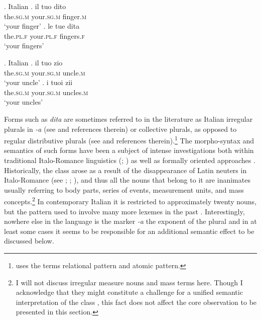 		\ex. Italian \citep[p. 125]{acquaviva2008lexical}\label{ex:italian-irregular-plurals-agreement} 
        \ag. il tuo dito\\
		the\textsc{.sg.m} your\textsc{.sg.m} finger\textsc{.m}\\
		`your finger'
		\bg. le tue dita\\
		the\textsc{.pl.f} your\textsc{.pl.f} fingers\textsc{.f}\\
		`your fingers'

		\ex. Italian \citep[p. 125]{acquaviva2008lexical}\label{ex:italian-regular-plurals-agreement}
        \ag. il tuo zio\\
		the\textsc{.sg.m} your\textsc{.sg.m} uncle\textsc{.m}\\
		`your uncle'
		\bg. i tuoi zii\\
		the\textsc{.sg.m} your\textsc{.sg.m} uncles\textsc{.m}\\
		`your uncles'
	
Forms such as \textit{dita} are sometimes referred to in the literature as Italian irregular plurals in \textit{-a} (see \citealt{acquaviva2008lexical} and references therein) or collective plurals, as opposed to regular distributive plurals (see \citealt{corbett2000number} and references therein).\footnote{\citet{kucerova2015two} uses the terms relational pattern and atomic pattern.} The morpho-syntax and semantics of such forms have been a subject of intense investigations both within traditional Italo-Romance linguistics (\citealt{hall1956plurale}; \citealt[pp. 30--90]{brunet1978grammaire}) as well as formally oriented approaches \citep{ojeda1995semantics,acquaviva2008lexical,kucerova2015two}. Historically, the class arose as a result of the disappearance of Latin neuters in Italo-Romance (see \citealt[pp. 46--51]{lofstedt1956syntactica}; \citealt{lausberg1963romanische}; \citealt{rohlfs1966grammatica}), and thus all the nouns that belong to it are inanimates usually referring to body parts, series of events, measurement units, and mass concepts.\footnote{I will not discuss irregular measure nouns and mass terms here. Though I acknowledge that they might constitute a challenge for a unified semantic interpretation of the class \citep[cf.][]{ojeda1995semantics,acquaviva2008lexical}, this fact does not affect the core observation to be presented in this section.} In contemporary Italian it is restricted to approximately twenty nouns, but the pattern used to involve many more lexemes in the past \citep{santangelo1981plurali}. Interestingly, nowhere else in the language is the marker \textit{-a} the exponent of the plural and in at least some cases it seems to be responsible for an additional semantic effect to be discussed below.
    
